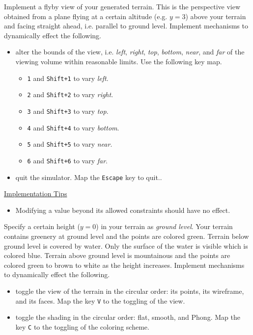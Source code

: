 \documentclass[addpoints]{exam}
\begin{document}
\begin{questions}

  Implement a flyby view of your generated terrain. This is the perspective view obtained from a plane flying at a certain altitude (e.g. $y=3$) above your terrain and facing straight ahead, i.e. parallel to ground level. Implement mechanisms to dynamically effect the following.
    \begin{itemize}
    \item alter the bounds of the view, i.e. \textit{left}, \textit{right}, \textit{top}, \textit{bottom}, \textit{near}, and \textit{far} of the viewing volume within reasonable limits. Use the following key map.
      \begin{itemize}
        \item \texttt{1} and \texttt{Shift+1} to vary \textit{left}.
        \item \texttt{2} and \texttt{Shift+2} to vary \textit{right}.
        \item \texttt{3} and \texttt{Shift+3} to vary \textit{top}.
        \item \texttt{4} and \texttt{Shift+4} to vary \textit{bottom}.
        \item \texttt{5} and \texttt{Shift+5} to vary \textit{near}.
        \item \texttt{6} and \texttt{Shift+6} to vary \textit{far}.
      \end{itemize}
    \item quit the simulator. Map the \texttt{Escape} key to quit..
    \end{itemize}

    \noindent\underline{Implementation Tips}
    \begin{itemize}
    \item Modifying a value beyond its allowed constraints should have no effect.
    \end{itemize}
    

    Specify a certain height ($y=0$) in your terrain as \textit{ground level}. Your terrain contains greenery at ground level and the points are colored green. Terrain below ground level is covered by water. Only the surface of the water is visible which is colored blue. Terrain above ground level is mountainous and the points are colored green to brown to white as the height increases. Implement mechanisms to dynamically effect the following.
    \begin{itemize}
    \item toggle the view of the terrain in the circular order: its points, its wireframe, and its faces. Map the key \texttt{V} to the toggling of the view. 
    \item toggle the shading in the circular order: flat, smooth, and Phong. Map the key \texttt{C} to the toggling of the coloring scheme.
    \end{itemize}


\end{questions}
\end{document}
